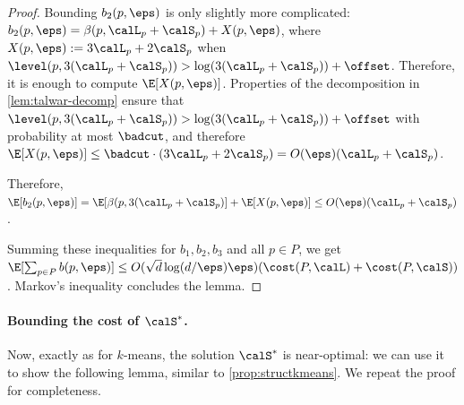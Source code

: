 \begin{proof}
Bounding $b_2(p, \eps)$ is only slightly more complicated: $b_2(p, \eps) = \beta(p, \calL_p + \calS_p) + X(p, \eps)$, where $X(p, \eps) := 3\calL_p + 2\calS_p$ when $\level(p, 3(\calL_p + \calS_p)) > \log(3(\calL_p + \calS_p)) + \offset$. 
Therefore, it is enough to compute $\E[X(p, \eps)]$.
Properties of the decomposition in \cref{lem:talwar-decomp} ensure that $\level(p, 3(\calL_p + \calS_p)) > \log(3(\calL_p + \calS_p)) + \offset$ with probability at most $\badcut$, and therefore $\E[X(p, \eps)] \leq \badcut \cdot (3\calL_p + 2\calS_p) = O(\eps)(\calL_p + \calS_p)$. 

Therefore, $\E[b_2(p, \eps)] = \E[\beta(p, 3(\calL_p + \calS_p)] + \E[X(p, \eps)] \leq O(\eps)(\calL_p + \calS_p)$.

Summing these inequalities for $b_1, b_2, b_3$ and all $p\in P$, we get $\E[\sum_{p \in P} b(p, \eps)] \leq O(\sqrt{d}\log(d/\eps)\eps)(\cost(P, \calL) + \cost(P, \calS))$. Markov's inequality concludes the lemma.
\end{proof}


\paragraph{Bounding the cost of $\calS^*$.}


Now, exactly as for $k$-means, the solution $\calS^*$ is near-optimal: we can use it to show the following lemma, similar to \cref{prop:structkmeans}. We repeat the proof for completeness.


